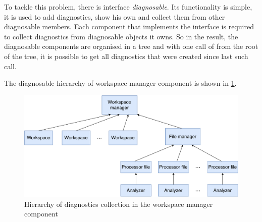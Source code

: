 To tackle this problem, there is interface \emph{diagnosable}. Its functionality is simple, it is used to add diagnostics, show his own and collect them from other diagnosable members. Each component that implements the interface is required to collect diagnostics from diagnosable objects it owns. So in the result, the diagnosable components are organised in a tree and with one call of  from the root of the tree, it is possible to get all diagnostics that were created since last such call.

The diagnosable hierarchy of workspace manager component is shown in \cref{diagnosable_hierarchy}.

\begin{figure}
	\centering
	\includegraphics[width=\textwidth]{img/diagnosable_hierarchy}
	\caption{Hierarchy of diagnostics collection in the workspace manager component}
	\label{diagnosable_hierarchy}
\end{figure}